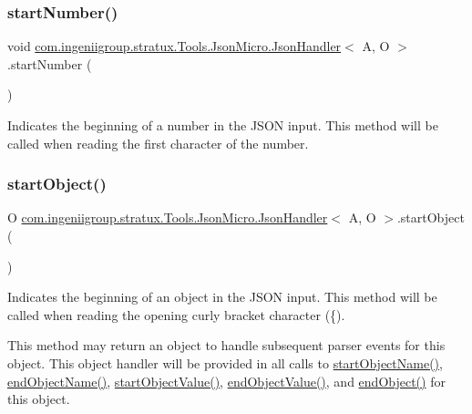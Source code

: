 \subsubsection{\texorpdfstring{start\+Number()}{startNumber()}}
{\footnotesize\ttfamily void \hyperlink{classcom_1_1ingeniigroup_1_1stratux_1_1_tools_1_1_json_micro_1_1_json_handler}{com.\+ingeniigroup.\+stratux.\+Tools.\+Json\+Micro.\+Json\+Handler}$<$ A, O $>$.start\+Number (\begin{DoxyParamCaption}{ }\end{DoxyParamCaption})}

Indicates the beginning of a number in the J\+S\+ON input. This method will be called when reading the first character of the number. \mbox{\label{classcom_1_1ingeniigroup_1_1stratux_1_1_tools_1_1_json_micro_1_1_json_handler_aeabcd8c9629a3266d432eaada3e62a01}} 
\subsubsection{\texorpdfstring{start\+Object()}{startObject()}}
{\footnotesize\ttfamily O \hyperlink{classcom_1_1ingeniigroup_1_1stratux_1_1_tools_1_1_json_micro_1_1_json_handler}{com.\+ingeniigroup.\+stratux.\+Tools.\+Json\+Micro.\+Json\+Handler}$<$ A, O $>$.start\+Object (\begin{DoxyParamCaption}{ }\end{DoxyParamCaption})}

Indicates the beginning of an object in the J\+S\+ON input. This method will be called when reading the opening curly bracket character ({\ttfamily \textquotesingle{}\{\textquotesingle{}}). 

This method may return an object to handle subsequent parser events for this object. This object handler will be provided in all calls to \hyperlink{}{start\+Object\+Name()}, \hyperlink{}{end\+Object\+Name()}, \hyperlink{}{start\+Object\+Value()}, \hyperlink{}{end\+Object\+Value()}, and \hyperlink{}{end\+Object()} for this object. 

